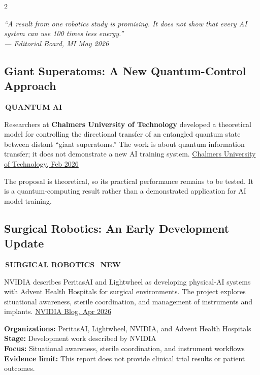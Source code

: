 \documentclass[10pt, a4paper]{article}
\newcommand{\sectiontag}[1]{%
  \noindent\colorbox{cobalt}{%
    \,\footnotesize\bfseries\color{white}\MakeUppercase{#1}\,}\,%
}
\newcommand{\newtag}{%
  \colorbox{emerald}{\,\scriptsize\bfseries\color{white}NEW\,}\ %
}
\newcommand{\ruled}{%
  \par\vspace{0.3em}%
  \noindent{\color{electric}\rule{\linewidth}{0.4pt}}\par
  \vspace{0.3em}}
\begin{document}
\begin{multicols}{2}
\begin{pullquote}
  {\large\itshape\color{white}
  ``A result from one robotics study is promising. It does not show that
  every AI system can use 100 times less energy.''\\[4pt]
  {\footnotesize\color{electric}--- Editorial Board, MI May 2026}}
\end{pullquote}

\ruled

\subsection{Giant Superatoms: A New Quantum-Control Approach}

\sectiontag{Quantum AI}

\medskip
{\small
Researchers at \textbf{Chalmers University of Technology} developed a theoretical model for controlling the directional transfer of an entangled quantum state between distant ``giant superatoms.'' The work is about quantum information transfer; it does not demonstrate a new AI training system.
\href{https://www.chalmers.se/en/current/news/mc2-giant-superatoms-unlock-a-new-toolbox-for-quantum-computers/}{Chalmers University of Technology, Feb 2026}

The proposal is theoretical, so its practical performance remains to be tested. It is a quantum-computing result rather than a demonstrated application for AI model training.
}

\subsection{Surgical Robotics: An Early Development Update}

\sectiontag{Surgical Robotics}\quad\newtag

\medskip
{\small
NVIDIA describes PeritasAI and Lightwheel as developing physical-AI systems with Advent Health Hospitals for surgical environments. The project explores situational awareness, sterile coordination, and management of instruments and implants.
\href{https://blogs.nvidia.com/blog/national-robotics-week-2026/}{NVIDIA Blog, Apr 2026}
}

\begin{databox}[title={\faMicroscope\quad What the Source Reports}]
  {\small
  \textbf{Organizations:} PeritasAI, Lightwheel, NVIDIA, and Advent Health Hospitals\\
  \textbf{Stage:} Development work described by NVIDIA\\
  \textbf{Focus:} Situational awareness, sterile coordination, and instrument workflows\\
  \textbf{Evidence limit:} This report does not provide clinical trial results or patient outcomes.}
\end{databox}


\end{multicols}
\end{document}
